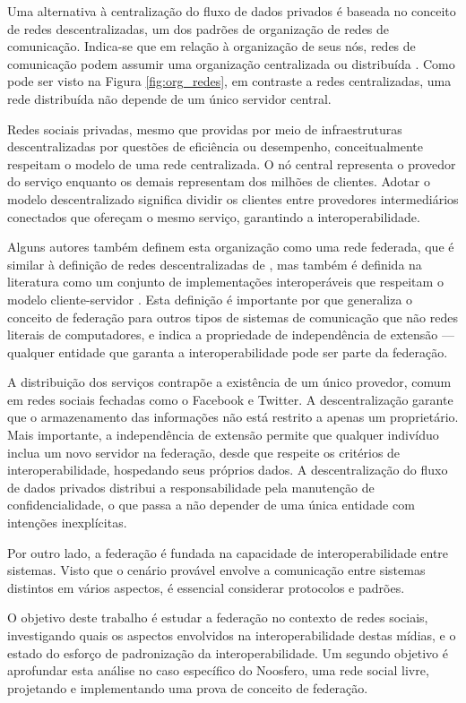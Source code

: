 Uma alternativa à centralização do fluxo de dados privados é baseada no conceito
de redes descentralizadas, um dos padrões de organização de redes de comunicação.
Indica-se que em relação à organização de seus nós, redes de comunicação podem
assumir uma organização centralizada ou distribuída \cite{baran1964}. Como pode ser
visto na Figura \ref{fig:org_redes}, em contraste a redes centralizadas, uma rede
distribuída não depende de um único servidor central.

Redes sociais privadas, mesmo que providas por meio de infraestruturas
descentralizadas por questões de eficiência ou desempenho, conceitualmente respeitam
o modelo de uma rede centralizada. O nó central representa o provedor do serviço
enquanto os demais representam dos milhões de clientes. Adotar o modelo
descentralizado significa dividir os clientes entre provedores intermediários
conectados que ofereçam o mesmo serviço, garantindo a interoperabilidade.

Alguns autores também definem esta organização como uma rede federada, que é similar
à definição de redes descentralizadas de \cite{baran1964}, mas também é definida na
literatura como um conjunto de implementações interoperáveis que respeitam o modelo
cliente-servidor \cite{barocas2012}. Esta definição é importante por que generaliza
o conceito de federação para outros tipos de sistemas de comunicação que não redes
literais de computadores, e indica a propriedade de independência de extensão ---
qualquer entidade que garanta a interoperabilidade pode ser parte da federação.

A distribuição dos serviços contrapõe a existência de um único provedor, comum em
redes sociais fechadas como o Facebook e Twitter. A descentralização garante que o
armazenamento das informações não está restrito a apenas um proprietário. Mais
importante, a independência de extensão permite que qualquer indivíduo inclua um
novo servidor na federação, desde que respeite os critérios de interoperabilidade,
hospedando seus próprios dados. A descentralização do fluxo de dados privados
distribui a responsabilidade pela manutenção de confidencialidade, o que passa a não
depender de uma única entidade com intenções inexplícitas.

Por outro lado, a federação é fundada na capacidade de interoperabilidade entre
sistemas. Visto que o cenário provável envolve a comunicação entre sistemas
distintos em vários aspectos, é essencial considerar protocolos e padrões.

O objetivo deste trabalho é estudar a federação no contexto de redes sociais,
investigando quais os aspectos envolvidos na interoperabilidade destas mídias, e o
estado do esforço de padronização da interoperabilidade. Um segundo objetivo é
aprofundar esta análise no caso específico do Noosfero, uma rede social livre,
projetando e implementando uma prova de conceito de federação.

